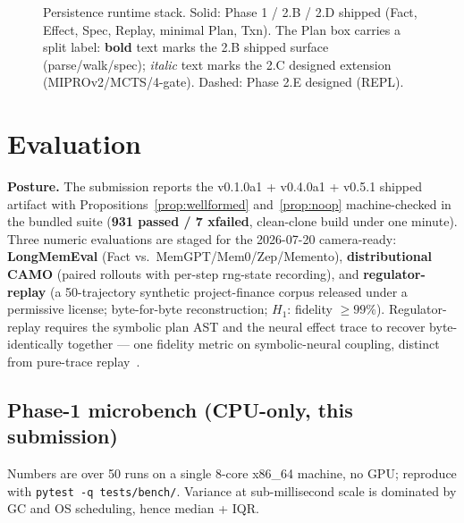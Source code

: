 \documentclass[anon]{nesy2026}   %
\newcommand{\C}[1]{\texttt{#1}}
\begin{document}
\begin{figure}[ht]
{%
}
\caption{Persistence runtime stack. Solid: Phase 1 / 2.B / 2.D shipped (Fact, Effect, Spec, Replay, minimal Plan, Txn). The Plan box carries a split label: \textbf{bold} text marks the 2.B shipped surface (parse/walk/spec); \textit{italic} text marks the 2.C designed extension (MIPROv2/MCTS/4-gate). Dashed: Phase 2.E designed (REPL).}
\label{fig:system-diagram}
\end{figure}

\section{Evaluation}\label{sec:eval}

\textbf{Posture.} The submission reports the v0.1.0a1 + v0.4.0a1 + v0.5.1 shipped artifact with Propositions~\ref{prop:wellformed} and~\ref{prop:noop} machine-checked in the bundled suite (\textbf{931 passed / 7 xfailed}, clean-clone build under one minute). Three numeric evaluations are staged for the 2026-07-20 camera-ready: \textbf{LongMemEval} (Fact vs.~MemGPT/Mem0/Zep/Memento), \textbf{distributional CAMO} (paired rollouts with per-step rng-state recording), and \textbf{regulator-replay} (a 50-trajectory synthetic project-finance corpus released under a permissive license; byte-for-byte reconstruction; $H_1$: fidelity $\geq 99\%$). Regulator-replay requires the symbolic plan AST and the neural effect trace to recover byte-identically together --- one fidelity metric on symbolic-neural coupling, distinct from pure-trace replay~\citep{anon2026camo,anon2026agenther}.

\subsection{Phase-1 microbench (CPU-only, this submission)}\label{sec:eval-microbench}

Numbers are over 50 runs on a single 8-core x86\_64 machine, no GPU; reproduce with \C{pytest -q tests/bench/}. Variance at sub-millisecond scale is dominated by GC and OS scheduling, hence median + IQR.
\end{document}
